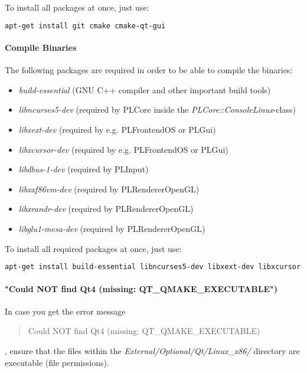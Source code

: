 To install all packages at once, just use: 
\begin{lstlisting}[language=sh]
apt-get install git cmake cmake-qt-gui
\end{lstlisting}


\paragraph{Compile Binaries}
The following packages are required in order to be able to compile the binaries:
\begin{itemize}
\item{\emph{build-essential} (GNU C++ compiler and other important build tools)}
\item{\emph{libncurses5-dev} (required by PLCore inside the \emph{PLCore::ConsoleLinux}-class)}
\item{\emph{libxext-dev} (required by e.g. PLFrontendOS or PLGui)}
\item{\emph{libxcursor-dev} (required by e.g. PLFrontendOS or PLGui)}
\item{\emph{libdbus-1-dev} (required by PLInput)}
\item{\emph{libxxf86vm-dev} (required by PLRendererOpenGL)}
\item{\emph{libxrandr-dev} (required by PLRendererOpenGL)}
\item{\emph{libglu1-mesa-dev} (required by PLRendererOpenGL)}
\end{itemize}

To install all required packages at once, just use:
\begin{lstlisting}[language=sh]
apt-get install build-essential libncurses5-dev libxext-dev libxcursor-dev libdbus-1-dev libxxf86vm-dev libxrandr-dev libglu1-mesa-dev
\end{lstlisting}


\paragraph{"Could NOT find Qt4 (missing: QT\_QMAKE\_EXECUTABLE")}
In case you get the error message \begin{quote}Could NOT find Qt4 (missing: QT\_QMAKE\_EXECUTABLE)\end{quote}, ensure that the files within the \emph{External/Optional/Qt/Linux\_x86/} directory are executable (file permissions).



